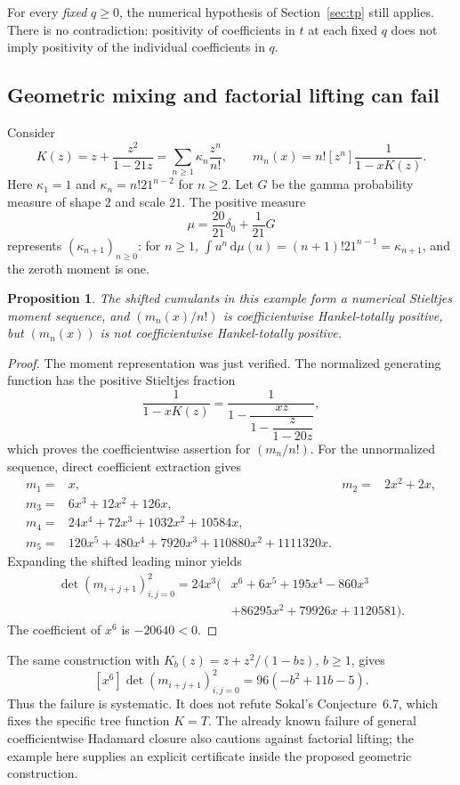 \documentclass[11pt,a4paper]{article}
\newtheorem{proposition}[theorem]{Proposition}
\theoremstyle{definition}
\theoremstyle{remark}
\newcommand{\dd}{\,\mathrm d}
\numberwithin{equation}{section}
\begin{document}
For every \emph{fixed} $q\ge0$, the numerical hypothesis of
Section~\ref{sec:tp} still applies. There is no contradiction: positivity
of coefficients in $t$ at each fixed $q$ does not imply positivity of the
individual coefficients in $q$.

\subsection{Geometric mixing and factorial lifting can fail}

Consider
\[
 K(z)=z+\frac{z^2}{1-21z}
     =\sum_{n\ge1}\kappa_n\frac{z^n}{n!},\qquad
 m_n(x)=n![z^n]\frac1{1-xK(z)}.
\]
Here $\kappa_1=1$ and $\kappa_n=n!21^{n-2}$ for $n\ge2$.
Let $G$ be the gamma probability measure of shape $2$ and scale $21$.
The positive measure
\[
 \mu=\frac{20}{21}\delta_0+\frac1{21}G
\]
represents $(\kappa_{n+1})_{n\ge0}$: for $n\ge1$,
$\int u^n\dd\mu(u)=(n+1)!21^{n-1}=\kappa_{n+1}$, and the
zeroth moment is one.

\begin{proposition}
The shifted cumulants in this example form a numerical Stieltjes moment
sequence, and $(m_n(x)/n!)$ is coefficientwise Hankel-totally positive,
but $(m_n(x))$ is not coefficientwise Hankel-totally positive.
\end{proposition}
\begin{proof}
The moment representation was just verified. The normalized generating
function has the positive Stieltjes fraction
\[
 \frac1{1-xK(z)}
 =\frac1{1-\dfrac{xz}{1-\dfrac{z}{1-20z}}},
\]
which proves the coefficientwise assertion for $(m_n/n!)$.
For the unnormalized sequence, direct coefficient extraction gives
\begin{align*}
 m_1={}&x, & m_2={}&2x^2+2x,\\
 m_3={}&6x^3+12x^2+126x,\\
 m_4={}&24x^4+72x^3+1032x^2+10584x,\\
 m_5={}&120x^5+480x^4+7920x^3+110880x^2+1111320x.
\end{align*}
Expanding the shifted leading minor yields
\begin{align*}
 \det(m_{i+j+1})_{i,j=0}^{2}
 =24x^3\big(&x^6+6x^5+195x^4-860x^3\\
            &+86295x^2+79926x+1120581\big).
\end{align*}
The coefficient of $x^6$ is $-20640<0$.
\end{proof}

The same construction with $K_b(z)=z+z^2/(1-bz)$, $b\ge1$, gives
\[
 [x^6]\det(m_{i+j+1})_{i,j=0}^{2}=96(-b^2+11b-5).
\]
Thus the failure is systematic. It does not refute Sokal's
Conjecture~6.7, which fixes the specific tree function $K=T$.
The already known failure of general coefficientwise Hadamard closure
also cautions against factorial lifting; the example here supplies an
explicit certificate inside the proposed geometric construction.
\end{document}
